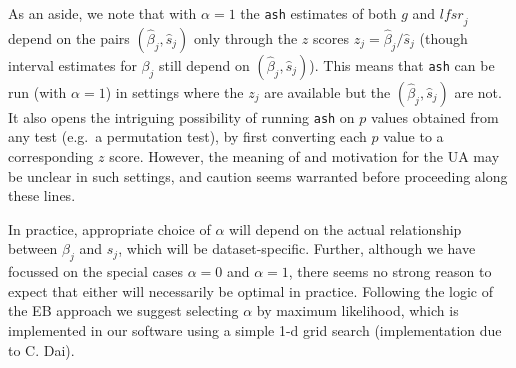 \documentclass[11pt]{article}
\def\lfsr{\textit{lfsr}}
\def\bhat{\hat{\beta}}
\def\shat{\hat{s}}
\def\ash{{\tt ash}\xspace}
\begin{document}
As an aside, we note that with $\alpha=1$ the \ash estimates of both $g$ and $\lfsr_j$ depend on the pairs $(\bhat_j,\shat_j)$ only through  the $z$ scores $z_j = \bhat_j/\shat_j$ (though interval estimates for $\beta_j$ still depend on 
$(\bhat_j,\shat_j)$). This means that \ash can be run (with $\alpha=1$) in settings where the $z_j$ are available but 
the $(\bhat_j,\shat_j)$ are not. It also opens the intriguing possibility 
of running \ash on $p$ values obtained from any test (e.g.~a permutation test), by first converting each $p$ value to a corresponding $z$ score. However, the meaning of and motivation for the UA may be unclear in such settings, and caution seems warranted before proceeding along these lines.

In practice, appropriate choice of $\alpha$ will depend on the actual relationship between $\beta_j$ and $s_j$, which will be dataset-specific. Further, although we have focussed on the special cases $\alpha=0$ and $\alpha=1$, there seems no strong reason to expect that either will necessarily be optimal in practice.
Following the logic of the EB approach we suggest selecting $\alpha$ by maximum likelihood, which is 
implemented in our software using a simple 1-d grid search (implementation due to C. Dai). 






\end{document}
